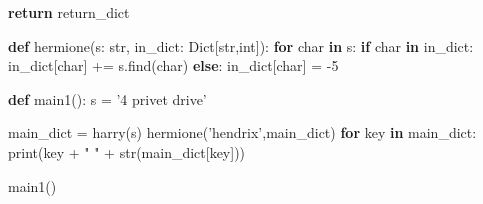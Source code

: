 \documentclass[]{article}
\newenvironment{Shaded}{}{}
\newcommand{\BuiltInTok}[1]{#1}
\newcommand{\ControlFlowTok}[1]{\textcolor[rgb]{0.00,0.44,0.13}{\textbf{#1}}}
\newcommand{\DecValTok}[1]{\textcolor[rgb]{0.25,0.63,0.44}{#1}}
\newcommand{\KeywordTok}[1]{\textcolor[rgb]{0.00,0.44,0.13}{\textbf{#1}}}
\newcommand{\NormalTok}[1]{#1}
\newcommand{\OperatorTok}[1]{\textcolor[rgb]{0.40,0.40,0.40}{#1}}
\newcommand{\StringTok}[1]{\textcolor[rgb]{0.25,0.44,0.63}{#1}}
\begin{document}
\begin{enumerate}
\begin{Shaded}
\begin{Highlighting}[]
    \ControlFlowTok{return}\NormalTok{ return_dict}

\KeywordTok{def}\NormalTok{ hermione(s: }\BuiltInTok{str}\NormalTok{, in_dict: Dict[}\BuiltInTok{str}\NormalTok{,}\BuiltInTok{int}\NormalTok{]):}
    \ControlFlowTok{for}\NormalTok{ char }\KeywordTok{in}\NormalTok{ s:}
        \ControlFlowTok{if}\NormalTok{ char }\KeywordTok{in}\NormalTok{ in_dict:}
\NormalTok{            in_dict[char] }\OperatorTok{+=}\NormalTok{ s.find(char)}
        \ControlFlowTok{else}\NormalTok{:}
\NormalTok{            in_dict[char] }\OperatorTok{=} \DecValTok{-5}

\KeywordTok{def}\NormalTok{ main1():}
\NormalTok{    s }\OperatorTok{=} \StringTok{'4 privet drive'}

\NormalTok{    main_dict }\OperatorTok{=}\NormalTok{ harry(s)}
\NormalTok{    hermione(}\StringTok{'hendrix'}\NormalTok{,main_dict)}
    \ControlFlowTok{for}\NormalTok{ key }\KeywordTok{in}\NormalTok{ main_dict:}
        \BuiltInTok{print}\NormalTok{(key }\OperatorTok{+} \StringTok{" "} \OperatorTok{+} \BuiltInTok{str}\NormalTok{(main_dict[key]))}

\NormalTok{main1()}
\end{Highlighting}
\end{Shaded}
\end{enumerate}
\end{document}
